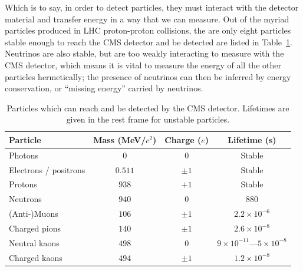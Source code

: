 Which is to say, in order to detect particles, they must interact with the detector material and transfer energy in a way that we can measure.
Out of the myriad particles produced in LHC proton-proton collisions, the are only eight particles stable enough to reach the CMS detector and be detected are listed in Table~\ref{tab:02_cms_particles}.
Neutrinos are also stable, but are too weakly interacting to measure with the CMS detector, which means it is vital to measure the energy of all the other particles hermetically; the presence of neutrinos can then be inferred by energy conservation, or ``missing energy'' carried by neutrinos.

\begin{table}[ht!]
    \centering
    \caption{Particles which can reach and be detected by the CMS detector. Lifetimes are given in the rest frame for unstable particles.}
    \label{tab:02_cms_particles}
    \begin{tabular}{@{}lccc@{}}
        \toprule
        \textbf{Particle} & \textbf{Mass (MeV/$c^2$)} & \textbf{Charge ($e$)} & \textbf{Lifetime (s)} \\
        \midrule
        Photons                      & $0$                    & $0$     & Stable \\
        Electrons / positrons         & $0.511$                & $\pm1$    & Stable \\
        Protons                      & $938$                  & $+1$    & Stable \\
        Neutrons                    & $940$                 & $0$     & $880$ \\
        (Anti-)Muons                       & $106$                  & $\pm1$    & $2.2 \times 10^{-6}$ \\
        Charged pions                & $140$                  & $\pm1$  & $2.6 \times 10^{-8}$ \\
        Neutral kaons               & $498$                 & $0$                     & $9 \times 10^{-11}$---$5 \times 10^{-8}$ \\
        Charged kaons                & $494$                  & $\pm1$  & $1.2 \times 10^{-8}$ \\
        \bottomrule
    \end{tabular}
\end{table}

